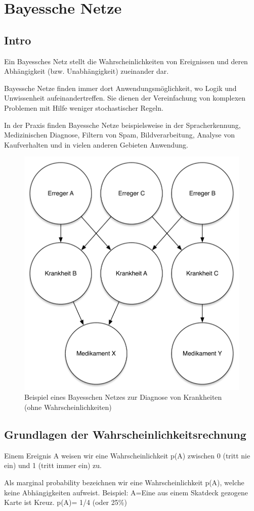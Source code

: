 
\chapter{Bayessche Netze}
\section{Intro}
Ein Bayessches Netz stellt die Wahrscheinlichkeiten von Ereignissen und deren Abhängigkeit (bzw. Unabhängigkeit) zueinander dar.

Bayessche Netze finden immer dort Anwendungsmöglichkeit, wo Logik und Unwissenheit aufeinandertreffen.
Sie dienen der Vereinfachung von komplexen Problemen mit Hilfe weniger stochastischer Regeln.

In der Praxis finden Bayessche Netze beispielsweise in der Spracherkennung, Medizinischen Diagnose, Filtern von Spam, Bildverarbeitung, Analyse von Kaufverhalten und in vielen anderen Gebieten Anwendung.

\begin{figure}[h]
    \centering
    \includegraphics[width=.4\textwidth]{chapters/bayes/bayes_intro.pdf}
    \caption{Beispiel eines Bayesschen Netzes zur Diagnose von Krankheiten (ohne Wahrscheinlichkeiten)}
\end{figure}

\section{Grundlagen der Wahrscheinlichkeitsrechnung}
Einem Ereignis A weisen wir eine Wahrscheinlichkeit p(A) zwischen 0 (tritt nie ein) und 1 (tritt immer ein) zu.

Als marginal probability bezeichnen wir eine Wahrscheinlichkeit p(A), welche keine Abhängigkeiten aufweist.
Beispiel: A=Eine aus einem Skatdeck gezogene Karte ist Kreuz.
p(A)= 1/4 (oder 25\%)

